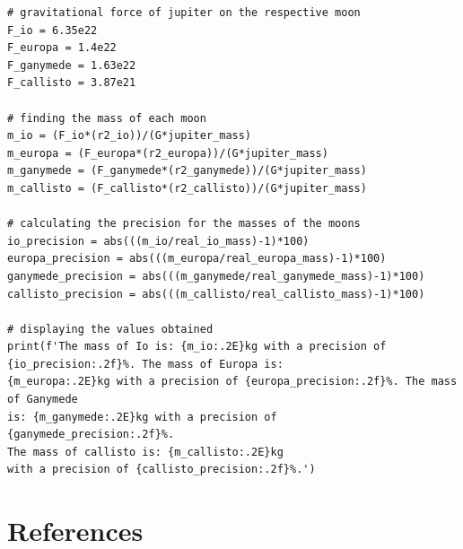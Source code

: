 \documentclass[12pt, a4paper]{article}
\begin{document}
\begin{verbatim}
# gravitational force of jupiter on the respective moon
F_io = 6.35e22
F_europa = 1.4e22
F_ganymede = 1.63e22
F_callisto = 3.87e21

# finding the mass of each moon
m_io = (F_io*(r2_io))/(G*jupiter_mass)
m_europa = (F_europa*(r2_europa))/(G*jupiter_mass)
m_ganymede = (F_ganymede*(r2_ganymede))/(G*jupiter_mass)
m_callisto = (F_callisto*(r2_callisto))/(G*jupiter_mass)

# calculating the precision for the masses of the moons
io_precision = abs(((m_io/real_io_mass)-1)*100)
europa_precision = abs(((m_europa/real_europa_mass)-1)*100)
ganymede_precision = abs(((m_ganymede/real_ganymede_mass)-1)*100)
callisto_precision = abs(((m_callisto/real_callisto_mass)-1)*100)

# displaying the values obtained
print(f'The mass of Io is: {m_io:.2E}kg with a precision of 
{io_precision:.2f}%. The mass of Europa is: 
{m_europa:.2E}kg with a precision of {europa_precision:.2f}%. The mass of Ganymede 
is: {m_ganymede:.2E}kg with a precision of
{ganymede_precision:.2f}%. 
The mass of callisto is: {m_callisto:.2E}kg 
with a precision of {callisto_precision:.2f}%.')
\end{verbatim}

\section{References}
\printbibliography[heading = none]
\end{document}
